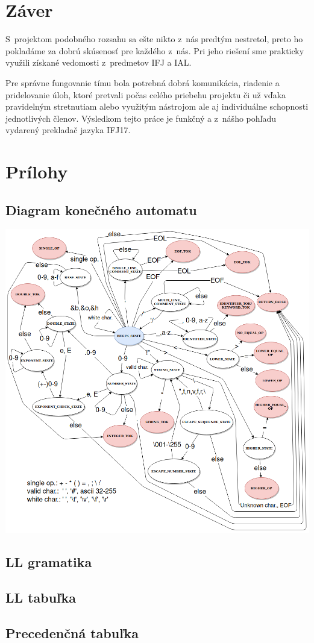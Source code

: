 \documentclass{article}
\begin{document}
    \section{Záver}
    S~projektom podobného rozsahu sa ešte nikto z~nás predtým nestretol, preto ho pokladáme za dobrú
    skúsenosť pre každého z~nás. Pri jeho riešení sme prakticky využili získané vedomosti z~predmetov
    IFJ a IAL.

    Pre správne fungovanie tímu bola potrebná dobrá komunikácia, riadenie a pridelovanie úloh, ktoré pretvali počas celého
    priebehu projektu či už vďaka pravidelným stretnutiam alebo využitým nástrojom ale aj individuálne
    schopnosti jednotlivých členov. Výsledkom tejto práce je funkčný a z~nášho pohľadu vydarený
    prekladač jazyka IFJ17.

    \newpage
    \section{Prílohy}
        \subsection{Diagram konečného automatu}
            \includegraphics[trim=6cm 0 0 0, width=15cm]{finite_automata.png}
        \subsection{LL gramatika}
        \subsection{LL tabuľka}
        \subsection{Precedenčná tabuľka}
\end{document}
